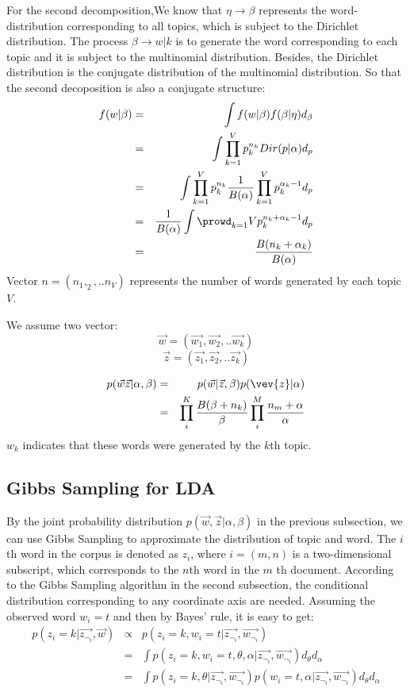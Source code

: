 For the second decomposition,We know that $\eta \rightarrow \beta$ represents the word-distribution corresponding to all topics, which is subject to the Dirichlet distribution. The process $\beta  \rightarrow w|k $  is to generate the word corresponding to each topic and it is subject to the multinomial distribution. Besides, the Dirichlet distribution is the conjugate distribution of the multinomial distribution. So that the second decoposition is also a conjugate structure:
\begin{eqnarray*}
  f(w|\beta) &=& \int f(w|\beta)f(\beta|\eta) d_{\beta} \\
              &=& \int \prod_{k=1}^V p_k^{n_k} Dir(p|\alpha) d_p \\
              &=& \int \prod_{k=1}^Vp_k^{n_k} \frac{1}{B(\alpha)}\prod_{k=1}^{V}p_k^{\alpha_k-1} d_p \\
              &=& \frac{1}{B(\alpha)}\int \prowd_{k=1}{V}p_k^{n_k+\alpha_k-1} d_p \\
              &=& \frac{B(n_k+\alpha_k)}{B(\alpha)}
\end{eqnarray*}
Vector $n = (n_1,_2,..n_V)$ represents the number of words generated by each topic $V$.

We assume two vector:
\[
  \vec{w} = (\vec{w_1},\vec{w_2},..\vec{w_k})
\]
\[
  \vec{z} = (\vec{z_1},\vec{z_2},..\vec{z_k})
\]


\begin{eqnarray*}
  p(\vec{w}\vec{z}|\alpha,\beta) & = & p(\vec{w}|\vec{z},\beta)p(\vev{z}|\alpha) \\
                                 & = & \prod_i^{K}\frac{B(\beta+n_k)}{\beta}\prod_i^M\frac{n_m+\alpha}{\alpha}
\end{eqnarray*}
$w_k$ indicates that these words were generated by the $k$th topic.

\subsection{Gibbs Sampling for LDA}
By the joint probability distribution $p(\vec{w},\vec{z}|\alpha,\beta)$ in the previous subsection, we can use Gibbs Sampling to approximate the distribution of topic and word. The $i$th word in the corpus  is denoted as $z_{i}$, where $i=(m,n)$ is a two-dimensional subscript, which corresponds to the $n$th word in the $m$ th document. According to the Gibbs Sampling algorithm in the second subsection, the conditional distribution corresponding to any coordinate axis are needed. Assuming the observed word $w_i=t$ and then by Bayes' rule, it is easy to get:
\begin{eqnarray*}
  p(z_i=k|\vec{z_{\neg_i}},\vec{w}) & \propto & p(z_i=k,w_i = t|\vec{z_{\neg_i}},\vec{w_{\neg_i}}) \\
  &=& \int p(z_i = k,w_i=t,\theta,\alpha|\vec{z_{\neg_i}},\vec{w_{\neg_i}})d_{\theta} d_{\alpha} \\
  &=& \int p(z_i=k,\theta|\vec{z_{\neg_i}},\vec{w_{\neg_i}}) p(w_i=t,\alpha|\vec{z_{\neg_i}},\vec{w_{\neg_i}})d_{\theta} d_{\alpha}\\

\end{eqnarray*}

